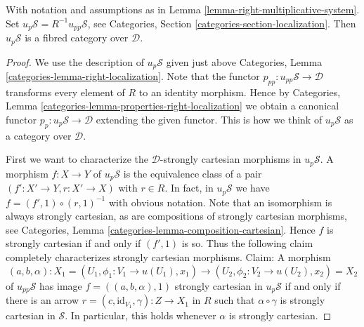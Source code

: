 \begin{lemma}
\label{lemma-fibred-category-pullback}
With notation and assumptions as in
Lemma \ref{lemma-right-multiplicative-system}.
Set $u_p\mathcal{S} = R^{-1}u_{pp}\mathcal{S}$, see
Categories, Section \ref{categories-section-localization}.
Then $u_p\mathcal{S}$ is a fibred category over $\mathcal{D}$.
\end{lemma}

\begin{proof}
We use the description of $u_p\mathcal{S}$ given just above
Categories, Lemma \ref{categories-lemma-right-localization}.
Note that the functor $p_{pp} : u_{pp}\mathcal{S} \to \mathcal{D}$
transforms every element of $R$ to an identity morphism.
Hence by
Categories, Lemma \ref{categories-lemma-properties-right-localization}
we obtain a canonical functor $p_p : u_p\mathcal{S} \to \mathcal{D}$
extending the given functor. This is how we think of
$u_p\mathcal{S}$ as a category over $\mathcal{D}$.

\medskip\noindent
First we want to characterize the $\mathcal{D}$-strongly cartesian morphisms
in $u_p\mathcal{S}$.
A morphism $f : X \to Y$ of $u_p\mathcal{S}$ is the equivalence class of
a pair $(f' : X' \to Y, r : X' \to X)$ with $r \in R$.
In fact, in $u_p\mathcal{S}$ we have $f = (f', 1) \circ (r, 1)^{-1}$
with obvious notation.
Note that an isomorphism is always strongly cartesian, as are
compositions of strongly cartesian morphisms, see
Categories, Lemma \ref{categories-lemma-composition-cartesian}.
Hence $f$ is strongly cartesian if and only if $(f', 1)$ is so.
Thus the following claim completely characterizes strongly cartesian
morphisms. Claim: A morphism
$$
(a, b, \alpha) :
X_1 = (U_1, \phi_1 : V_1 \to u(U_1), x_1)
\longrightarrow
(U_2, \phi_2 : V_2 \to u(U_2), x_2) = X_2
$$
of $u_{pp}\mathcal{S}$ has image $f = ((a, b, \alpha), 1)$
strongly cartesian in $u_p\mathcal{S}$ if and only if there is an arrow
$r = (c,\text{id}_{V_1},\gamma) : Z \to X_1$ in $R$ such that
$\alpha \circ \gamma$ is strongly cartesian in $\mathcal{S}$.
In particular, this holds whenever $\alpha$ is strongly cartesian.


\end{proof}
